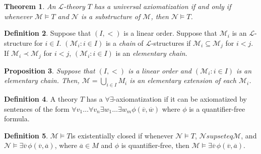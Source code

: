 \documentclass{amsart}
\newtheorem{theorem}{Theorem}[section]
\newtheorem{proposition}[theorem]{Proposition}
\theoremstyle{definition}
\newtheorem{definition}[theorem]{Definition}
\numberwithin{equation}{section}
\begin{document}
\begin{theorem}
    An $\mathcal{L}$-theory $T$ has a universal axiomatization if and only if 
    whenever $\mathcal{M} \models T$ and $\mathcal{N}$ is a substructure of $\mathcal{M}$,
    then $\mathcal{N} \models T$.
\end{theorem}

\begin{definition}
    Suppose that $(I,<)$ is a linear order.
    Suppose that $\mathcal{M}_i$ is an $\mathcal{L}$-structure for $i \in I$.
    $(\mathcal{M}_i: i \in I)$ is a \emph{chain} of $\mathcal{L}$-structures if $\mathcal{M}_i \subseteq \mathcal{M}_j$ for $i < j$.
    If $\mathcal{M}_i \prec \mathcal{M}_j$ for $i < j$,
    $(\mathcal{M}_i: i \in I)$ is an \emph{elementary chain}.
\end{definition}

\begin{proposition}
    Suppose that $(I,<)$ is a linear order and
    $(\mathcal{M}_i: i \in I)$ is an elementary chain.
    Then, $\mathcal{M} = \bigcup_{i\in I} M_i$ is an elementary extension of each $\mathcal{M}_i$.
\end{proposition}

\begin{definition}
    A theory $T$ has a $\forall\exists$-axiomatization if it can be axiomatized by sentences of the form $\forall v_1\dots\forall v_n \exists w_1\dots \exists w_m \phi(\overline{v},\overline{w})$ 
    where $\phi$ is a quantifier-free formula.
\end{definition}

\begin{definition}
    $\mathcal{M} \models T$is existentially closed 
    if whenever $\mathcal{N} \models T$, $\mathcal{N} supseteq \mathcal{M}$,
    and $\mathcal{N} \models \exists \overline{v}\, \phi(\overline{v},\overline{a})$,
    where $\overline{a} \in M$ and $\phi$ is quantifier-free,
    then $\mathcal{M} \models \exists \overline{v} \, \phi(\overline{v},\overline{a})$.
\end{definition}
\end{document}
